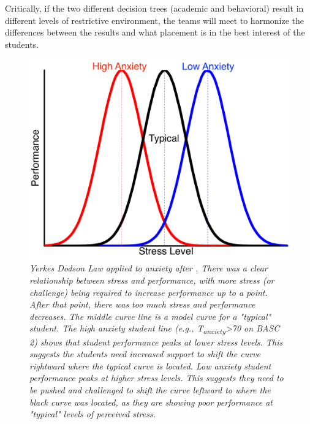 \documentclass[twoside]{article}
\begin{document}
Critically, if the two different decision trees (academic and behavioral) result in different levels of restrictive environment, the teams will meet to harmonize the differences between the results and what placement is in the best interest of the students. 
%
%
%
%
%
\begin{figure}[htp!]
\includegraphics[width=\textwidth]{Yerkes-Dodson.pdf}
\caption[Yerkes Dodson Law]{\textit{Yerkes Dodson Law applied to anxiety after \parencite{yerkes1908relation}. There was a clear relationship between stress and performance, with more stress (or challenge) being required to increase performance up to a point. After that point, there was too much stress and performance decreases. The middle curve line is a model curve for a "typical" student. The high anxiety student line (\textit{e.g.}, T\textsubscript{anxiety}\textgreater70 on BASC 2) shows that student performance peaks at lower stress levels. This suggests the students need increased support to shift the curve rightward where the typical curve is located. Low anxiety student performance peaks at higher stress levels. This suggests they need to be pushed and challenged to shift the curve leftward to where the black curve was located, as they are showing poor performance at "typical" levels of perceived stress.}}
\label{fig2}
\end{figure}
%
%
%
%
%
\end{document}
